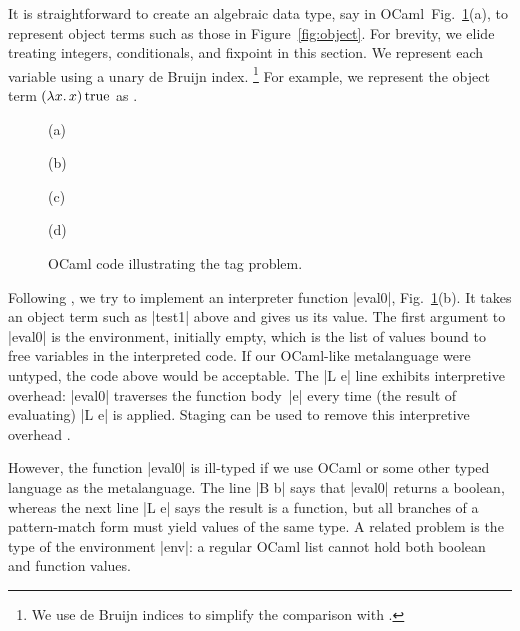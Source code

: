 It is straightforward to create an algebraic data type, say in OCaml\ifshort\
Fig.~\ref{fig:tag-problem}(a)\fi, to
represent object terms such as those in Figure~\ref{fig:object}.
For brevity, we elide treating integers, conditionals, and fixpoint in
this section.
\ifshort\else{}\fi
We represent each variable using a unary de Bruijn index.%
\footnote{We use de Bruijn indices to simplify the comparison with
\citearound{'s work}\citet{WalidICFP02}.}
For example, we represent the object term $(\mathopen{\lambda\mathord{x}.\,}x)\mathinner{\mathrm{true}}$ as
\ifshort {}.\else {}\fi

\ifshort
\begin{figure}
%
(a) 

(b) 

(c) 

(d) 
\caption{OCaml code illustrating the tag problem.}
\label{fig:tag-problem}
\end{figure}
\fi

\noindent Following \citep{WalidICFP02},
we try to implement an interpreter function |eval0|\ifshort,
Fig.~\ref{fig:tag-problem}(b)\fi. It takes
an object term such as |test1| above and gives us its value.
The first argument to |eval0| is the environment, initially empty,
which is the list of values bound to free variables in the
interpreted code.
\ifshort\else{}\fi
If our OCaml-like metalanguage were untyped, the code above would be 
acceptable.
The |L e| line exhibits interpretive overhead:
|eval0| traverses the function body~|e| every time (the result of
evaluating) |L e| is applied. Staging can be used to remove this
interpretive overhead \citep[\S1.1--2]{WalidICFP02}.

However, the function |eval0| is ill-typed
if we use OCaml or some other typed language as the metalanguage.
The line |B b|
says that |eval0| returns a boolean, whereas the next line |L e| says
the result is a function, but all branches of a pattern-match form must
yield values of the same type. 
A related problem is the type of the environment |env|: a regular
OCaml list cannot hold both boolean and function values. 

